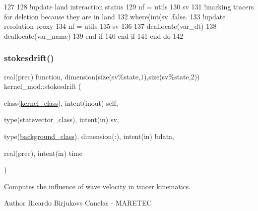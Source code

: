 \begin{DoxyCode}
127 
128                 \textcolor{comment}{!update land interaction status}
129                 nf = utils%
130                 sv%
131                 \textcolor{comment}{!marking tracers for deletion because they are in land}
132                 \textcolor{keywordflow}{where}(int(sv%
      .false.
133                 \textcolor{comment}{!update resolution proxy}
134                 nf = utils%
135                 sv%
136 
137                 \textcolor{keyword}{deallocate}(var\_dt)
138                 \textcolor{keyword}{deallocate}(var\_name)
139 \textcolor{keywordflow}{            end if}
140 \textcolor{keywordflow}{        end if}
141 \textcolor{keywordflow}{    end do}
142 
\end{DoxyCode}
\mbox{\label{namespacekernel__mod_a69811135e6a881c537873c59451f689e}} 
\subsubsection{\texorpdfstring{stokesdrift()}{stokesdrift()}}
{\footnotesize\ttfamily real(prec) function, dimension(size(sv\%state,1),size(sv\%state,2)) kernel\+\_\+mod\+::stokesdrift (\begin{DoxyParamCaption}\item[{class(\mbox{\hyperlink{structkernel__mod_1_1kernel__class}{kernel\+\_\+class}}), intent(inout)}]{self,  }\item[{type(statevector\+\_\+class), intent(in)}]{sv,  }\item[{type(\mbox{\hyperlink{structbackground__mod_1_1background__class}{background\+\_\+class}}), dimension(\+:), intent(in)}]{bdata,  }\item[{real(prec), intent(in)}]{time }\end{DoxyParamCaption})}



Computes the influence of wave velocity in tracer kinematics. 

\begin{DoxyAuthor}{Author}
Ricardo Birjukovs Canelas -\/ M\+A\+R\+E\+T\+EC 
\end{DoxyAuthor}

